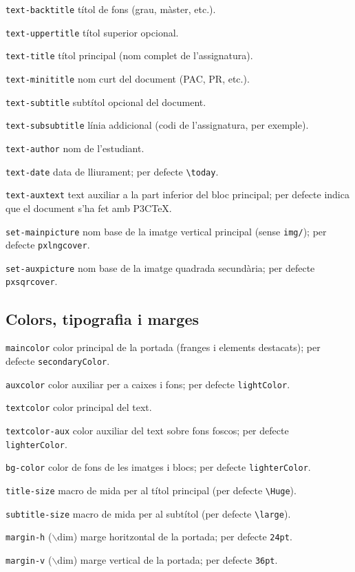 \documentclass[11pt,a4paper]{article}
\begin{document}
\begin{description}
  \item{\verb|text-backtitle|} títol de fons (grau, màster, etc.).
  \item{\verb|text-uppertitle|} títol superior opcional.
  \item{\verb|text-title|} títol principal (nom complet de
    l'assignatura).
  \item{\verb|text-minititle|} nom curt del document (PAC, PR, etc.).
  \item{\verb|text-subtitle|} subtítol opcional del document.
  \item{\verb|text-subsubtitle|} línia addicional (codi de
    l'assignatura, per exemple).
  \item{\verb|text-author|} nom de l'estudiant.
  \item{\verb|text-date|} data de lliurament; per defecte \verb|\today|.
  \item{\verb|text-auxtext|} text auxiliar a la part inferior del bloc
    principal; per defecte indica que el document s'ha fet amb P3CTeX.
  \item{\verb|set-mainpicture|} nom base de la imatge vertical
    principal (sense \verb|img/|); per defecte \verb|pxlngcover|.
  \item{\verb|set-auxpicture|} nom base de la imatge quadrada secundària;
    per defecte \verb|pxsqrcover|.
\end{description}

\subsection*{Colors, tipografia i marges}

\begin{description}
  \item{\verb|maincolor|} color principal de la portada (franges i
    elements destacats); per defecte \verb|secondaryColor|.
  \item{\verb|auxcolor|} color auxiliar per a caixes i fons; per
    defecte \verb|lightColor|.
  \item{\verb|textcolor|} color principal del text.
  \item{\verb|textcolor-aux|} color auxiliar del text sobre fons
    foscos; per defecte \verb|lighterColor|.
  \item{\verb|bg-color|} color de fons de les imatges i blocs; per
    defecte \verb|lighterColor|.
  \item{\verb|title-size|} macro de mida per al títol principal
    (per defecte \verb|\Huge|).
  \item{\verb|subtitle-size|} macro de mida per al subtítol
    (per defecte \verb|\large|).
  \item{\verb|margin-h| ($\backslash$dim)} marge horitzontal de la portada;
    per defecte \verb|24pt|.
  \item{\verb|margin-v| ($\backslash$dim)} marge vertical de la portada;
    per defecte \verb|36pt|.
\end{description}
\end{document}
